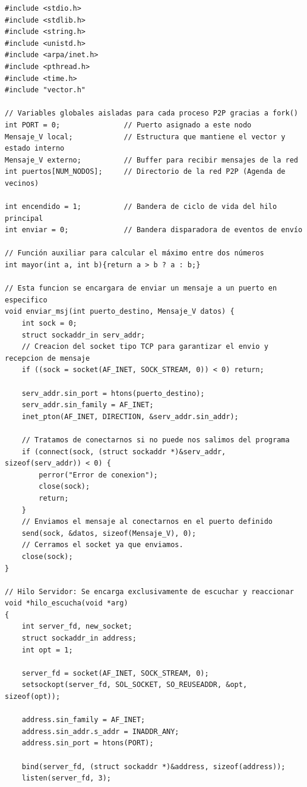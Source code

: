 \begin{lstlisting}[style=estiloC]
#include <stdio.h>
#include <stdlib.h>
#include <string.h>
#include <unistd.h>
#include <arpa/inet.h>
#include <pthread.h>
#include <time.h>
#include "vector.h"

// Variables globales aisladas para cada proceso P2P gracias a fork()
int PORT = 0;               // Puerto asignado a este nodo
Mensaje_V local;            // Estructura que mantiene el vector y estado interno
Mensaje_V externo;          // Buffer para recibir mensajes de la red
int puertos[NUM_NODOS];     // Directorio de la red P2P (Agenda de vecinos)

int encendido = 1;          // Bandera de ciclo de vida del hilo principal
int enviar = 0;             // Bandera disparadora de eventos de envío

// Función auxiliar para calcular el máximo entre dos números
int mayor(int a, int b){return a > b ? a : b;}

// Esta funcion se encargara de enviar un mensaje a un puerto en especifico
void enviar_msj(int puerto_destino, Mensaje_V datos) {
    int sock = 0;
    struct sockaddr_in serv_addr;
    // Creacion del socket tipo TCP para garantizar el envio y recepcion de mensaje
    if ((sock = socket(AF_INET, SOCK_STREAM, 0)) < 0) return;

    serv_addr.sin_port = htons(puerto_destino);
    serv_addr.sin_family = AF_INET;
    inet_pton(AF_INET, DIRECTION, &serv_addr.sin_addr);

    // Tratamos de conectarnos si no puede nos salimos del programa
    if (connect(sock, (struct sockaddr *)&serv_addr, sizeof(serv_addr)) < 0) {
        perror("Error de conexion");
        close(sock);
        return;
    }
    // Enviamos el mensaje al conectarnos en el puerto definido
    send(sock, &datos, sizeof(Mensaje_V), 0);
    // Cerramos el socket ya que enviamos.
    close(sock);
}

// Hilo Servidor: Se encarga exclusivamente de escuchar y reaccionar
void *hilo_escucha(void *arg)
{
    int server_fd, new_socket;
    struct sockaddr_in address;
    int opt = 1;

    server_fd = socket(AF_INET, SOCK_STREAM, 0);
    setsockopt(server_fd, SOL_SOCKET, SO_REUSEADDR, &opt, sizeof(opt));

    address.sin_family = AF_INET;
    address.sin_addr.s_addr = INADDR_ANY;
    address.sin_port = htons(PORT);

    bind(server_fd, (struct sockaddr *)&address, sizeof(address));
    listen(server_fd, 3);


\end{lstlisting}
